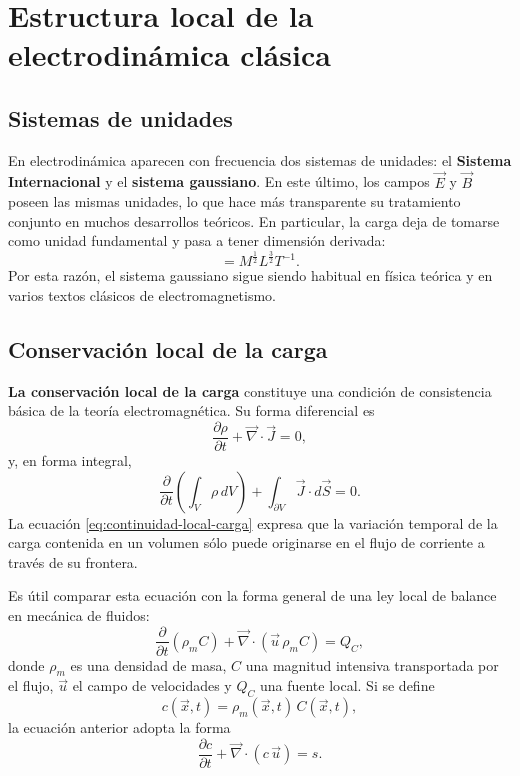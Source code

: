 \documentclass[../main.tex]{subfiles}
\begin{document}
\chapter{Estructura local de la electrodinámica clásica}

\section{Sistemas de unidades}

En electrodinámica aparecen con frecuencia dos sistemas de unidades: el \textbf{Sistema Internacional} y el \textbf{sistema gaussiano}. En este último, los campos $\vec E$ y $\vec B$ poseen las mismas unidades, lo que hace más transparente su tratamiento conjunto en muchos desarrollos teóricos. En particular, la carga deja de tomarse como unidad fundamental y pasa a tener dimensión derivada:
\begin{equation*}
    [q]= M^{\frac{1}{2}} L^{\frac{3}{2}}T^{-1}.
\end{equation*}
Por esta razón, el sistema gaussiano sigue siendo habitual en física teórica y en varios textos clásicos de electromagnetismo.


\section{Conservación local de la carga}

\textbf{La conservación local de la carga} constituye una condición de consistencia básica de la teoría electromagnética. Su forma diferencial es
\begin{equation}
    \frac{\partial \rho}{\partial t}+\vec\nabla\cdot\vec J = 0,
    \label{eq:continuidad-local-carga}
\end{equation}
y, en forma integral,
\begin{equation*}
    \frac{\partial}{\partial t}\left(\int_V \rho\, dV\right)+\int_{\partial V}\vec J\cdot d\vec S=0.
\end{equation*}
La ecuación \eqref{eq:continuidad-local-carga} expresa que la variación temporal de la carga contenida en un volumen sólo puede originarse en el flujo de corriente a través de su frontera.

Es útil comparar esta ecuación con la forma general de una ley local de balance en mecánica de fluidos:
\begin{equation*}
    \frac{\partial}{\partial t}(\rho_m C)+\vec\nabla\cdot(\vec u\,\rho_m C)=Q_C,
\end{equation*}
donde $\rho_m$ es una densidad de masa, $C$ una magnitud intensiva transportada por el flujo, $\vec u$ el campo de velocidades y $Q_C$ una fuente local. Si se define
\begin{equation*}
    c(\vec x,t)=\rho_m(\vec x,t)\,C(\vec x,t),
\end{equation*}
la ecuación anterior adopta la forma
\begin{equation*}
    \frac{\partial c}{\partial t}+\vec\nabla\cdot(c\,\vec u)=s.
\end{equation*}
\end{document}
